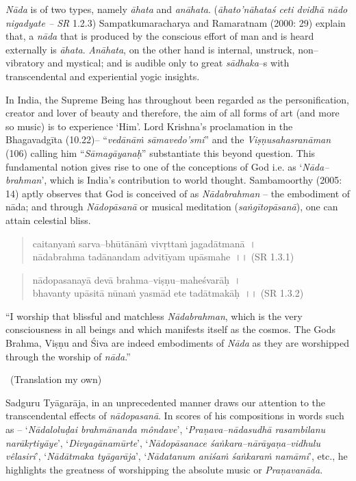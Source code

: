 \textit{Nāda} is of two types, namely \textit{āhata} and \textit{anāhata}. (\textit{āhato’nāhataś ceti dvidhā nādo nigadyate – SR} 1.2.3) Sampatkumaracharya and Ramaratnam (2000: 29) explain that, a \textit{nāda} that is produced by the conscious effort of man and is heard externally is \textit{āhata}. \textit{Anāhata}, on the other hand is internal, unstruck, non–vibratory and mystical; and is audible only to great \textit{sādhaka}–s with transcendental and experiential yogic insights.

In India, the Supreme Being has throughout been regarded as the personification, creator and lover of beauty and therefore, the aim of all forms of art (and more so music) is to experience ‘Him’. Lord Krishna’s proclamation in the Bhagavadgīta (10.22)– “\textit{vedānāṁ sāmavedo’smi}” and the \textit{Viṣṇusahasranāman} (106) calling him “\textit{Sāmagāyanaḥ}” substantiate this beyond question. This fundamental notion gives rise to one of the conceptions of God i.e. as ‘\textit{Nāda–brahman}’, which is India’s contribution to world thought. Sambamoorthy (2005: 14) aptly observes that God is conceived of as \textit{Nādabrahman} – the embodiment of nāda; and through \textit{Nādopāsanā} or musical meditation (\textit{saṅgītopāsanā}), one can attain celestial bliss.

\begin{verse}
caitanyaṁ sarva–bhūtānāṁ vivṛttaṁ jagadātmanā~।\\ nādabrahma tadānandam advitīyam upāsmahe~।। (SR 1.3.1)
\end{verse}

\begin{verse}
nādopasanayā devā brahma–viṣṇu–maheśvarāḥ~।\\ bhavanty upāsitā nūnaṁ yasmād ete tadātmakāḥ~।। (SR 1.3.2)
\end{verse}

\begin{myquote}
“I worship that blissful and matchless \textit{Nādabrahman}, which is the very consciousness in all beings and which manifests itself as the cosmos. The Gods Brahma, Viṣṇu and Śiva are indeed embodiments of \textit{Nāda} as they are worshipped through the worship of \textit{nāda}.” 

~\hfill (Translation my own)
\end{myquote}

Sadguru Tyāgarāja, in an unprecedented manner draws our attention to the transcendental effects of \textit{nādopasanā}. In scores of his compositions in words such as – ‘\textit{Nādaloluḍai brahmānanda môndave}’, ‘\textit{Praṇava–nādasudhā rasambilanu narākṛtiyāye}’, ‘\textit{Divyagānamūrte}’, ‘\textit{Nādopāsanace śaṅkara–nārāyaṇa–vidhulu vêlasiri}’, ‘\textit{Nādātmaka tyāgarāja}’, ‘\textit{Nādatanum aniśaṁ śaṅkaraṁ namāmi}’, etc., he highlights the greatness of worshipping the absolute music or \textit{Praṇavanāda}.

